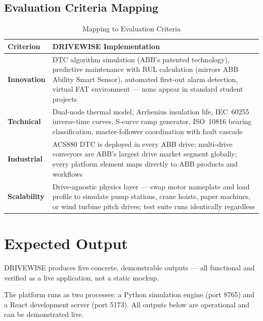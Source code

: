 \documentclass[9pt,a4paper,twocolumn,twoside]{tau-class/tau}
\begin{document}
\subsection{Evaluation Criteria Mapping}

\begin{table}[H]
    \caption{Mapping to Evaluation Criteria}
    \label{tab:criteria}
    \begin{tabular}{@{}p{} p{}@{}}
    \toprule
    \textbf{Criterion} & \textbf{DRIVEWISE Implementation} \\
    \midrule
    \textbf{Innovation} & DTC algorithm simulation (ABB's patented technology), predictive maintenance with RUL calculation (mirrors ABB Ability Smart Sensor), automated first-out alarm detection, virtual FAT environment — none appear in standard student projects \\
    \textbf{Technical} & Dual-node thermal model, Arrhenius insulation life, IEC~60255 inverse-time curves, S-curve ramp generator, ISO~10816 bearing classification, master-follower coordination with fault cascade \\
    \textbf{Industrial} & ACS880 DTC is deployed in every ABB drive; multi-drive conveyors are ABB's largest drive market segment globally; every platform element maps directly to ABB products and workflows \\
    \textbf{Scalability} & Drive-agnostic physics layer — swap motor nameplate and load profile to simulate pump stations, crane hoists, paper machines, or wind turbine pitch drives; test suite runs identically regardless \\
    \bottomrule
    \end{tabular}
\end{table}


\section{Expected Output}

DRIVEWISE produces five concrete, demonstrable outputs — all functional and verified as a live application, not a static mockup.

\begin{note}
The platform runs as two processes: a Python simulation engine (port 8765) and a React development server (port 5173). All outputs below are operational and can be demonstrated live.
\end{note}
\end{document}
